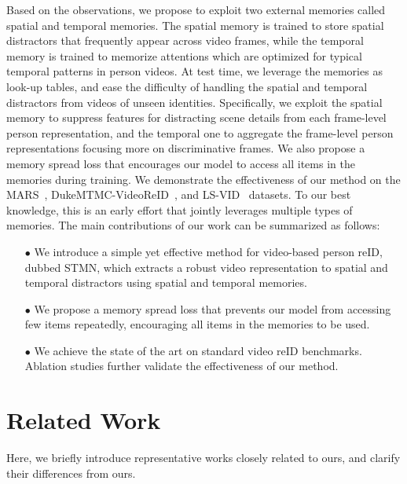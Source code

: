 \documentclass[10pt,twocolumn,letterpaper]{article}
\begin{document}
Based on the observations, we propose to exploit two external memories called spatial and temporal memories. The spatial memory is trained to store spatial distractors that frequently appear across video frames, while the temporal memory is trained to memorize attentions which are optimized for typical temporal patterns in person videos. At test time, we leverage the memories as look-up tables, and ease the difficulty of handling the spatial and temporal distractors from videos of unseen identities. Specifically, we exploit the spatial memory to suppress features for distracting scene details from each frame-level person representation, and the temporal one to aggregate the frame-level person representations focusing more on discriminative frames. We also propose a memory spread loss that encourages our model to access all items in the memories during training. We demonstrate the effectiveness of our method on the MARS~\cite{zheng2016mars}, DukeMTMC-VideoReID~\cite{wu2018exploit}, and LS-VID~\cite{li2019global} datasets. To our best knowledge, this is an early effort that jointly leverages multiple types of memories. The main contributions of our work can be summarized as follows:

	\vspace{-0.1cm}	
	\begin{itemize}[leftmargin=*]
		\item[$\bullet$] We introduce a simple yet effective method for video-based person reID, dubbed STMN, which extracts a robust video representation to spatial and temporal distractors using spatial and temporal memories.
		\vspace{-0.1cm}
		\item[$\bullet$] We propose a memory spread loss that prevents our model from accessing few items repeatedly, encouraging all items in the memories to be used.
		\vspace{-0.1cm}
		\item[$\bullet$] We achieve the state of the art on standard video reID benchmarks.  Ablation studies further validate the effectiveness of our method.
	\end{itemize}
	


\section{Related Work}
\vspace{-0.2cm}
	
	Here, we briefly introduce representative works closely related to ours, and clarify their differences from ours.
	
\end{document}

